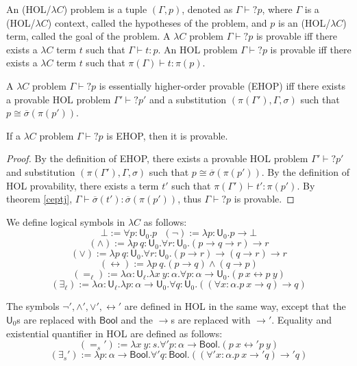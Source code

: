 \begin{definition} An (HOL/$\lambda C$) problem is a tuple $(\Gamma, p)$, denoted
  as $\Gamma \vdash? p$, where $\Gamma$ is a (HOL/$\lambda C$)
  context, called the hypotheses of the problem, and $p$ is an
  (HOL/$\lambda C$) term, called the goal of the problem. A $\lambda C$ problem
  $\Gamma \vdash? p$ is provable iff there exists a $\lambda C$ term $t$ such that
  $\Gamma \vdash t : p$. An HOL problem $\Gamma \vdash? p$ is provable iff there exists
  a $\lambda C$ term $t$ such that $\pi(\Gamma) \vdash t : \pi(p)$.
\end{definition}

\begin{definition} A $\lambda C$ problem $\Gamma \vdash? p$ is essentially higher-order provable (EHOP)
  iff there exists a provable HOL problem $\Gamma' \vdash? p'$ and a substitution
  $(\pi(\Gamma'), \Gamma, \sigma)$ such that $p \cong \overline{\sigma}(\pi(p'))$.
\end{definition}

\begin{theorem}
  If a $\lambda C$ problem $\Gamma \vdash? p$ is EHOP, then it is provable.
\end{theorem}
\begin{proof} By the definition of EHOP, there exists a provable HOL problem
  $\Gamma' \vdash? p'$ and substitution $(\pi(\Gamma'), \Gamma, \sigma)$ such that
  $p \cong \overline{\sigma}(\pi(p'))$. By the definition of HOL provability, there exists
  a term $t'$ such that $\pi(\Gamma') \vdash t' : \pi(p')$. By theorem \ref{ceptj},
  $\Gamma \vdash \overline{\sigma}(t') : \overline{\sigma}(\pi(p'))$, thus $\Gamma \vdash? p$
  is provable.
\end{proof}

We define logical symbols in $\lambda C$ as follows:
$$\bot := \forall p : \mathsf{U}_0. p \ \ \ (\neg) := \lambda p : \mathsf{U}_0. p \to \bot$$
$$(\land) := \lambda p \ q : \mathsf{U}_0. \forall r : \mathsf{U}_0. (p \to q \to r) \to r$$
$$(\lor) := \lambda p \ q : \mathsf{U}_0. \forall r : \mathsf{U}_0. (p \to r) \to (q \to r) \to r$$
$$(\leftrightarrow) := \lambda p \ q. (p \to q) \land (q \to p)$$
$$(=_\ell) := \lambda \alpha : \mathsf{U}_\ell. \lambda x \ y : \alpha. \forall p : \alpha \to \mathsf{U}_0. (p \ x \leftrightarrow p \ y)$$
$$(\exists_\ell) := \lambda \alpha : \mathsf{U}_\ell. \lambda p : \alpha \to \mathsf{U}_0. \forall q : \mathsf{U}_0. ((\forall x : \alpha. p \ x \to q) \to q)$$

The symbols $\neg', \land', \lor', \leftrightarrow'$ are defined in HOL in the
same way, except that the $\mathsf{U}_0$s are replaced with $\mathsf{Bool}$ and the $\to$s are
replaced with $\to'$. Equality and existential quantifier in HOL are defined as follows:
$$(=_s') := \lambda x \ y : s. \forall' p : \alpha \to \mathsf{Bool}. (p \ x \leftrightarrow' p \ y)$$
$$(\exists_s') := \lambda p : \alpha \to \mathsf{Bool}. \forall' q : \mathsf{Bool}. ((\forall' x : \alpha. p \ x \to' q) \to' q)$$

